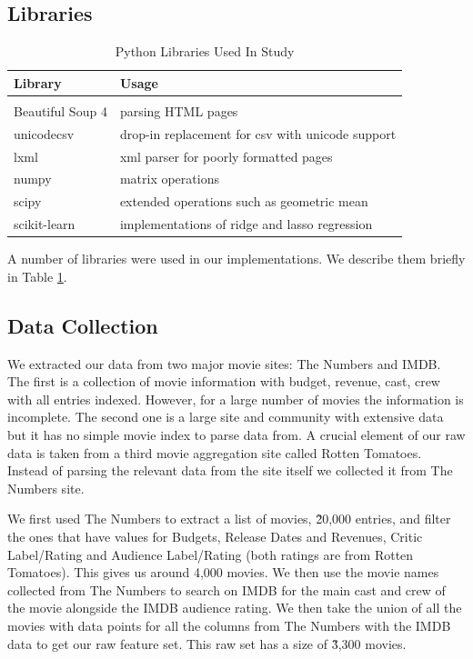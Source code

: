 \documentclass[conference]{IEEEtran}
\begin{document}
\subsection{Libraries}
\begin{table}[h]
\caption{Python Libraries Used In Study}
\label{table:pylibs}
\begin{tabular}{l|l}
Library          & Usage \\
\hline
\\
Beautiful Soup 4\cite{beautifulsoup} & parsing HTML pages \\
unicodecsv\cite{unicodecsv}       & drop-in replacement for csv with unicode support \\
lxml\cite{lxml}             & xml parser for poorly formatted pages \\
numpy\cite{numpy}           & matrix operations\\
scipy\cite{scipy}            & extended operations such as geometric mean \\
scikit-learn\cite{scikit-learn}     & implementations of ridge and lasso regression \\ 
\end{tabular}
\end{table}

A number of libraries were used in our implementations. We describe them briefly in Table \ref{table:pylibs}. 

\subsection{Data Collection}
We extracted our data from two major movie sites: The Numbers \cite{thenumbers} and IMDB\cite{imdb}.
The first is a collection of movie information with budget, revenue, cast, crew with all entries indexed. However, for a large number of movies the information is incomplete. The second one is a large site and community with extensive data but it has no simple movie index to parse data from. A crucial element of our raw data is taken from a third movie aggregation site called Rotten Tomatoes. Instead of parsing the relevant data from the site itself we collected it from The Numbers site.

We first used The Numbers to extract a list of movies, \~20,000 entries, and 
filter the ones that have values for Budgets, Release Dates and 
Revenues, Critic Label/Rating and Audience Label/Rating
(both ratings are from Rotten Tomatoes\cite{rtomato}). 
This gives us around 4,000 movies. We then use the movie names 
collected from The Numbers to search on IMDB for the main cast 
and crew of the movie alongside the IMDB audience rating. We then 
take the union of all the movies with data points for all the 
columns from The Numbers with the IMDB data to get our raw
feature set. This raw set has a size of \~3,300 movies.
\end{document}
